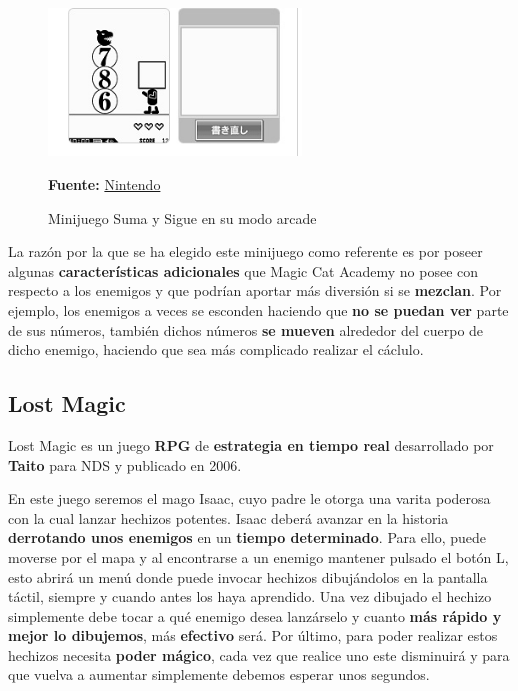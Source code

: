 \begin{figure}[htbp]
\centering
  \includegraphics[width=0.6\textwidth]{archivos/brain-sumtotaled2.jpg}
  \caption{Minijuego Suma y Sigue en su modo arcade}
  \textbf{Fuente:} \href{https://www.nintendo.co.jp/ds/dsiware/kndjknrj/training2/index.html}{Nintendo}
  \label{fig:sumtotaled2}
\end{figure}

La razón por la que se ha elegido este minijuego como referente es por poseer algunas \textbf{características adicionales} que Magic Cat Academy no posee con respecto a los enemigos y que podrían aportar más diversión si se \textbf{mezclan}. Por ejemplo, los enemigos a veces se esconden haciendo que \textbf{no se puedan ver} parte de sus números, también dichos números \textbf{se mueven} alrededor del cuerpo de dicho enemigo, haciendo que sea más complicado realizar el cáclulo.

\vspace{1cm}

\subsection{Lost Magic}

Lost Magic es un juego \textbf{RPG} de \textbf{estrategia en tiempo real} desarrollado por \textbf{Taito} para NDS y publicado en 2006.

\vspace{0.5cm}

En este juego seremos el mago Isaac, cuyo padre le otorga una varita poderosa con la cual lanzar hechizos potentes. Isaac deberá avanzar en la historia \textbf{derrotando unos enemigos} en un \textbf{tiempo determinado}. Para ello, puede moverse por el mapa y al encontrarse a un enemigo mantener pulsado  el botón L, esto abrirá un menú donde puede invocar hechizos dibujándolos en la pantalla táctil, siempre y cuando antes los haya aprendido. Una vez dibujado el hechizo simplemente debe tocar  a qué enemigo desea lanzárselo y cuanto \textbf{más rápido y mejor lo dibujemos}, más \textbf{efectivo} será. Por último, para poder realizar estos hechizos necesita \textbf{poder mágico}, cada vez que realice uno este disminuirá y para que vuelva a aumentar simplemente debemos esperar unos segundos.

